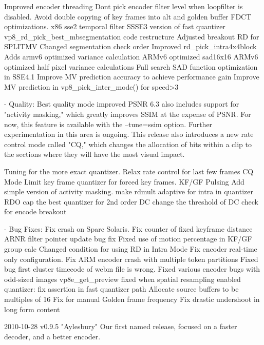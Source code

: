 \begin{DoxyVerbInclude}
        Improved encoder threading
        Dont pick encoder filter level when loopfilter is disabled.
        Avoid double copying of key frames into alt and golden buffer
        FDCT optimizations.
        x86 sse2 temporal filter
        SSSE3 version of fast quantizer
        vp8_rd_pick_best_mbsegmentation code restructure
        Adjusted breakout RD for SPLITMV
        Changed segmentation check order
        Improved rd_pick_intra4x4block
        Adds armv6 optimized variance calculation
        ARMv6 optimized sad16x16
        ARMv6 optimized half pixel variance calculations
        Full search SAD function optimization in SSE4.1
        Improve MV prediction accuracy to achieve performance gain
        Improve MV prediction in vp8_pick_inter_mode() for speed>3

  - Quality:
      Best quality mode improved PSNR 6.3%
      also includes support for "activity masking," which greatly improves
      SSIM at the expense of PSNR. For now, this feature is available with
      the --tune=ssim option. Further experimentation in this area
      is ongoing. This release also introduces a new rate control mode
      called "CQ," which changes the allocation of bits within a clip to
      the sections where they will have the most visual impact.

        Tuning for the more exact quantizer.
        Relax rate control for last few frames
        CQ Mode
        Limit key frame quantizer for forced key frames.
        KF/GF Pulsing
        Add simple version of activity masking.
        make rdmult adaptive for intra in quantizer RDO
        cap the best quantizer for 2nd order DC
        change the threshold of DC check for encode breakout

  - Bug Fixes:
      Fix crash on Sparc Solaris.
      Fix counter of fixed keyframe distance
      ARNR filter pointer update bug fix
      Fixed use of motion percentage in KF/GF group calc
      Changed condition for using RD in Intra Mode
      Fix encoder real-time only configuration.
      Fix ARM encoder crash with multiple token partitions
      Fixed bug first cluster timecode of webm file is wrong.
      Fixed various encoder bugs with odd-sized images
      vp8e_get_preview fixed when spatial resampling enabled
      quantizer: fix assertion in fast quantizer path
      Allocate source buffers to be multiples of 16
      Fix for manual Golden frame frequency
      Fix drastic undershoot in long form content


2010-10-28 v0.9.5 "Aylesbury"
  Our first named release, focused on a faster decoder, and a better encoder.


\end{DoxyVerbInclude}
